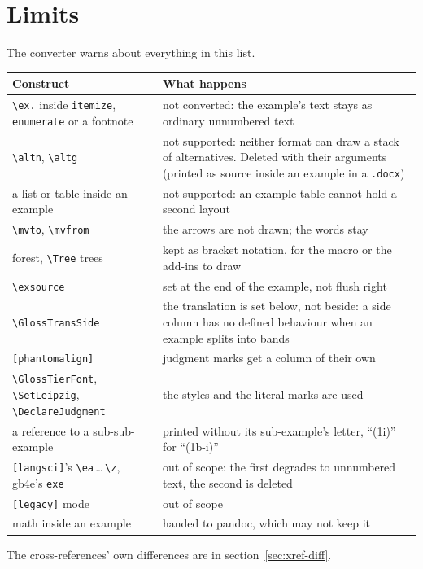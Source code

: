 \documentclass[11pt,a4paper]{article}
\newcommand{\cs}[1]{\texttt{\textbackslash #1}}
\newcommand{\file}[1]{\texttt{#1}}
\newcommand{\pkg}[1]{\textsf{#1}}
\begin{document}
\section{Limits}\label{sec:limits}

The converter warns about everything in this list.

\begin{longtable}{@{}p{4.6cm} p{8.6cm}@{}}
\toprule
\textbf{Construct} & \textbf{What happens}\\
\midrule
\endhead
\cs{ex.} inside \texttt{itemize}, \texttt{enumerate} or a footnote & not
  converted: the example's text stays as ordinary unnumbered text\\
\cs{altn}, \cs{altg} & not supported: neither format can draw a stack of
  alternatives. Deleted with their arguments (printed as source inside an
  example in a \file{.docx})\\
a list or table inside an example & not supported: an example table cannot
  hold a second layout\\
\cs{mvto}, \cs{mvfrom} & the arrows are not drawn; the words stay\\
\pkg{forest}, \cs{Tree} trees & kept as bracket notation, for the macro or
  the add-ins to draw\\
\cs{exsource} & set at the end of the example, not flush right\\
\cs{GlossTransSide} & the translation is set below, not beside: a side
  column has no defined behaviour when an example splits into bands\\
\texttt{[phantomalign]} & judgment marks get a column of their own\\
\cs{GlossTierFont}, \cs{SetLeipzig}, \cs{DeclareJudgment} & the styles and
  the literal marks are used\\
a reference to a sub-sub-example & printed without its sub-example's letter,
  ``(1i)'' for ``(1b-i)''\\
\texttt{[langsci]}'s \cs{ea}\,\ldots\,\cs{z}, \pkg{gb4e}'s \texttt{exe} &
  out of scope: the first degrades to unnumbered text, the second is deleted\\
\texttt{[legacy]} mode & out of scope\\
math inside an example & handed to pandoc, which may not keep it\\
\bottomrule
\end{longtable}

\noindent The cross-references' own differences are in
section~\ref{sec:xref-diff}.
\end{document}
